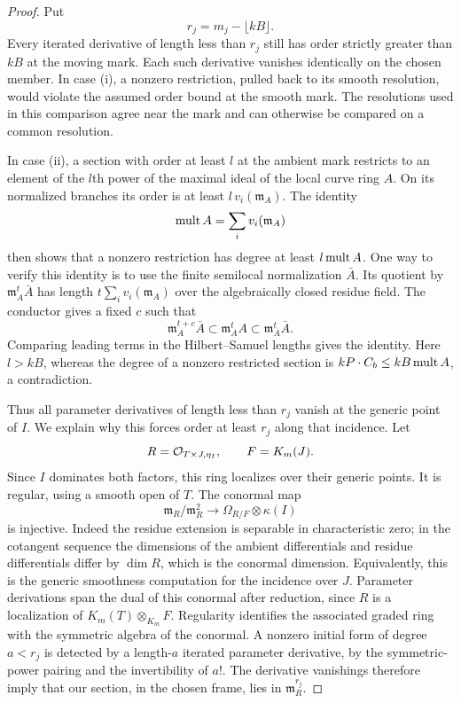 \begin{proof}
Put
\[
 r_j=m_j-\lfloor kB\rfloor.
\]
Every iterated derivative of length less than $r_j$ still has order
strictly greater than $kB$ at the moving mark.  Each such derivative
vanishes identically on the chosen member.  In case (i), a nonzero
restriction, pulled back to its smooth resolution, would violate the
assumed order bound at the smooth mark.  The resolutions used in this
comparison agree near the mark and can otherwise be compared on a
common resolution.

In case (ii), a section with order at least $l$ at the ambient mark
restricts to an element of the $l$th power of the maximal ideal of the
local curve ring $A$.  On its normalized branches its order is at least
$l\,v_i(\mathfrak m_A)$.  The identity
\[
 \operatorname{mult} A=\sum_i v_i(\mathfrak m_A)
\]
then shows that a nonzero restriction has degree at least
$l\operatorname{mult} A$.  One way to verify this identity is to use the finite
semilocal normalization $\bar A$.  Its quotient by
$\mathfrak m_A^t\bar A$ has length
$t\sum_i v_i(\mathfrak m_A)$ over the algebraically closed residue
field.  The conductor gives a fixed $c$ such that
\[
 \mathfrak m_A^{t+c}\bar A
 \subset \mathfrak m_A^t A
 \subset \mathfrak m_A^t\bar A.
\]
Comparing leading terms in the Hilbert--Samuel lengths gives the
identity.  Here $l>kB$, whereas the degree of a nonzero restricted
section is $kP\cdot C_b\le kB\operatorname{mult} A$, a contradiction.

Thus all parameter derivatives of length less than $r_j$ vanish at the
generic point of $I$.  We explain why this forces order at least $r_j$
along that incidence.  Let
\[
 R=\mathcal O_{T\times J,\eta_I},\qquad F=K_m(J).
\]
Since $I$ dominates both factors, this ring localizes over their generic
points.  It is regular, using a smooth open of $T$.  The conormal map
\[
 \mathfrak m_R/\mathfrak m_R^2
 \longrightarrow \Omega_{R/F}\otimes\kappa(I)
\]
is injective.  Indeed the residue extension is separable in
characteristic zero; in the cotangent sequence the dimensions of the
ambient differentials and residue differentials differ by $\dim R$,
which is the conormal dimension.  Equivalently, this is the generic
smoothness computation for the incidence over $J$.
Parameter derivations span the dual of this conormal after reduction,
since $R$ is a localization of
$K_m(T)\otimes_{K_m}F$.  Regularity identifies the associated graded
ring with the symmetric algebra of the conormal.  A nonzero initial
form of degree $a<r_j$ is detected by a length-$a$ iterated parameter
derivative, by the symmetric-power pairing and the invertibility of
$a!$.  The derivative vanishings therefore imply that our section, in
the chosen frame, lies in $\mathfrak m_R^{r_j}$.


\end{proof}
